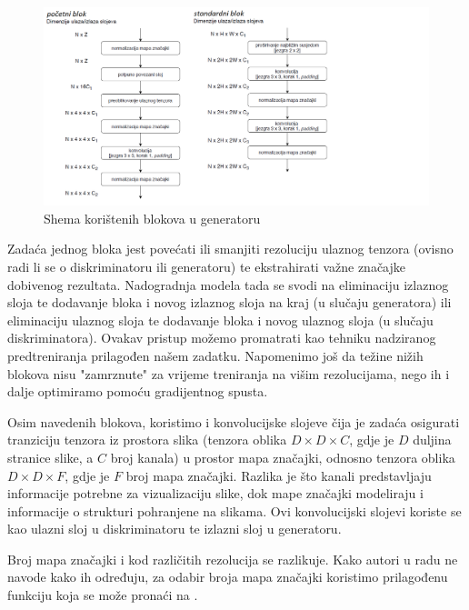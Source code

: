 \begin{figure}[h]
\centering
		\includegraphics[height=0.7\textwidth]{images/blokovi_generatora.png}
\caption{Shema korištenih blokova u generatoru}
\label{gen_blocks}
\end{figure}

Zadaća jednog bloka jest povećati ili smanjiti rezoluciju ulaznog tenzora (ovisno radi li se o diskriminatoru ili generatoru) te ekstrahirati važne značajke dobivenog rezultata. Nadogradnja modela tada se svodi na eliminaciju izlaznog sloja te dodavanje bloka i novog izlaznog sloja na kraj (u slučaju generatora) ili eliminaciju ulaznog sloja te dodavanje bloka i novog ulaznog sloja (u slučaju diskriminatora). Ovakav pristup možemo promatrati kao tehniku nadziranog predtreniranja \citep{cupic2019nadpred} prilagođen našem zadatku. Napomenimo još da težine nižih blokova nisu "zamrznute" za vrijeme treniranja na višim rezolucijama, nego ih i dalje optimiramo pomoću gradijentnog spusta.

Osim navedenih blokova, koristimo i konvolucijske slojeve čija je zadaća osigurati tranziciju tenzora iz prostora slika (tenzora oblika $D \times D \times C$, gdje je $D$ duljina stranice slike, a $C$ broj kanala) u prostor mapa značajki, odnosno tenzora oblika $D \times D \times F$, gdje je $F$ broj mapa značajki. Razlika je što kanali predstavljaju informacije potrebne za vizualizaciju slike, dok mape značajki modeliraju i informacije o strukturi pohranjene na slikama. Ovi konvolucijski slojevi koriste se kao ulazni sloj u diskriminatoru te izlazni sloj u generatoru.

Broj mapa značajki i kod različitih rezolucija se razlikuje. Kako autori u radu ne navode kako ih određuju, za odabir broja mapa značajki koristimo prilagođenu funkciju koja se može pronaći na \citep{progressive_gan_git}.

